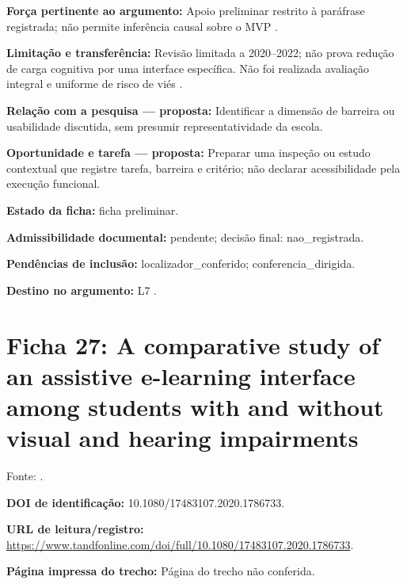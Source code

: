 \noindent\textbf{Força pertinente ao argumento:} Apoio preliminar restrito à paráfrase registrada; não permite inferência causal sobre o MVP \citep{cob2023}.\par\medskip

\noindent\textbf{Limitação e transferência:} Revisão limitada a 2020–2022; não prova redução de carga cognitiva por uma interface específica. Não foi realizada avaliação integral e uniforme de risco de viés \citep{cob2023}.\par\medskip

\noindent\textbf{Relação com a pesquisa — proposta:} Identificar a dimensão de barreira ou usabilidade discutida, sem presumir representatividade da escola.\par\medskip

\noindent\textbf{Oportunidade e tarefa — proposta:} Preparar uma inspeção ou estudo contextual que registre tarefa, barreira e critério; não declarar acessibilidade pela execução funcional.\par\medskip

\noindent\textbf{Estado da ficha:} ficha preliminar.\par\medskip

\noindent\textbf{Admissibilidade documental:} pendente; decisão final: nao\_registrada.\par\medskip

\noindent\textbf{Pendências de inclusão:} localizador\_conferido; conferencia\_dirigida.\par\medskip

\noindent\textbf{Destino no argumento:} L7 .

\clearpage\section*{Ficha 27: A comparative study of an assistive e-learning interface among students with and without visual and hearing impairments}

Fonte: \citet{farhan2020}.

\noindent\textbf{DOI de identificação:} 10.1080/17483107.2020.1786733.\par\medskip

\noindent\textbf{URL de leitura/registro:} \url{https://www.tandfonline.com/doi/full/10.1080/17483107.2020.1786733}.\par\medskip

\noindent\textbf{Página impressa do trecho:} Página do trecho não conferida.\par\medskip

